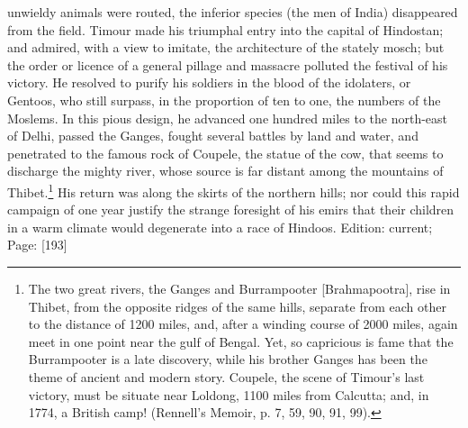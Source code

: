 unwieldy animals were routed, the inferior species (the men of India) disappeared from the field. Timour made his triumphal entry into the capital of Hindostan; and admired, with a view to imitate, the architecture of the stately mosch; but the order or licence of a general pillage and massacre polluted the festival of his victory. He resolved to purify his soldiers in the blood of the idolaters, or Gentoos, who still surpass, in the proportion of ten to one, the numbers of the Moslems. In this pious design, he advanced one hundred miles to the north-east of Delhi, passed the Ganges, fought several battles by land and water, and penetrated to the famous rock of Coupele, the statue of the cow, that seems to discharge the mighty river, whose source is far distant among the mountains of Thibet.\footnote{The two great rivers, the Ganges and Burrampooter [Brahmapootra], rise in Thibet, from the opposite ridges of the same hills, separate from each other to the distance of 1200 miles, and, after a winding course of 2000 miles, again meet in one point near the gulf of Bengal. Yet, so capricious is fame that the Burrampooter is a late discovery, while his brother Ganges has been the theme of ancient and modern story. Coupele, the scene of Timour\texthebrew{}’s last victory, must be situate near Loldong, 1100 miles from Calcutta; and, in 1774, a British camp! (Rennell\texthebrew{}’s Memoir, p. 7, 59, 90, 91, 99).} His return was along the skirts of the northern hills; nor could this rapid campaign of one year justify the strange foresight of his emirs that their children in a warm climate would degenerate into a race of Hindoos.
Edition: current; Page: [193]

